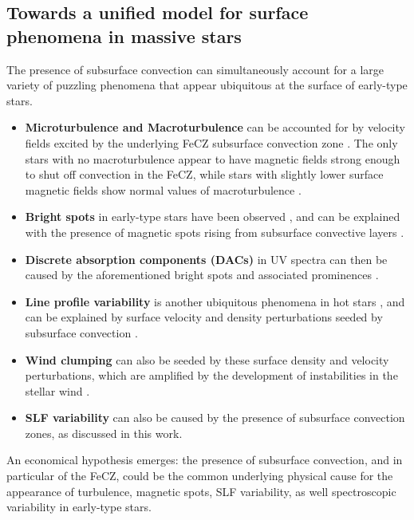 \documentclass[twocolumn]{aastex63}
\begin{document}
\subsection{Towards a unified model for surface phenomena in massive stars}
The presence of subsurface convection can simultaneously account for a large variety of puzzling phenomena that appear ubiquitous at the surface of early-type stars.
\begin{itemize}
\item {\bf Microturbulence and Macroturbulence} can be accounted for by velocity fields excited by the underlying FeCZ subsurface convection zone \citep{Cantiello:2009,Grassitelli:2015,2015ApJ...813...74J}. The only stars with no macroturbulence appear to have magnetic fields strong enough to shut off convection in the FeCZ, while stars with slightly lower surface magnetic fields show normal values of macroturbulence \citep{10.1093/mnras/stt921}. 
\item {\bf Bright spots}  in early-type stars have been observed  \citep[e.g.][]{Ramiaramanantsoa:2014}, and can be explained with the presence of magnetic spots rising from subsurface convective layers \citep{Cantiello:2011,Cantiello:2019}. 
\item {\bf Discrete absorption components (DACs)} in UV spectra \citep[e.g.][]{Howarth:1989,Cranmer:1996,Fullerton:1997,Kaper:1997} can then be caused by the aforementioned bright spots \citep{Cantiello:2011} and associated prominences \citep{Sudnik:2016}. 
\item {\bf Line profile variability}   is another ubiquitous phenomena in hot stars \citep{Fullerton:1996}, and can be explained by surface velocity and density perturbations seeded by subsurface convection \citep[e.g.][]{Cantiello:2009,2015ApJ...813...74J}.
\item {\bf Wind clumping} can also be seeded by these surface density and velocity perturbations, which are amplified by the development of instabilities in the stellar wind \citep[][but see also \citet{Sundqvist:2013}]{Owocki:1988}.
\item {\bf SLF variability}  can also be caused by the presence of  subsurface convection zones, as discussed in this work.  
\end{itemize}
An economical hypothesis emerges: the presence of subsurface convection, and in particular of the FeCZ, could be the common underlying physical cause for the appearance of turbulence, magnetic spots, SLF variability, as well spectroscopic variability in early-type stars. 
\end{document}
